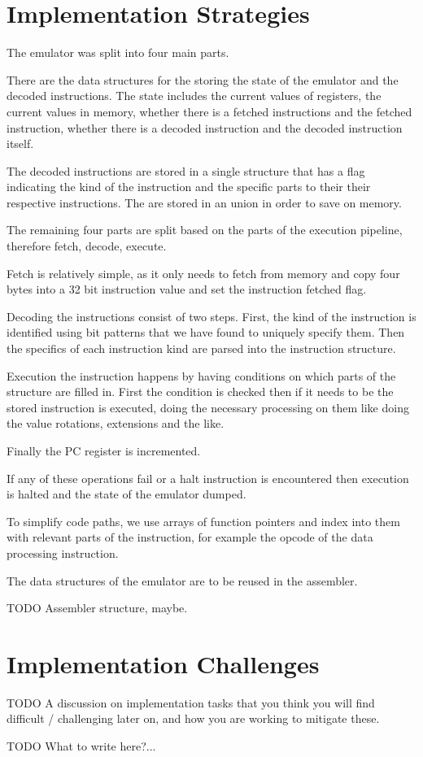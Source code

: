 \documentclass[11pt]{article}
\begin{document}
\section{Implementation Strategies}

The emulator was split into four main parts.

There are the data structures for the storing the state of the emulator and the
decoded instructions. The state includes the current values of registers, the
current values in memory, whether there is a fetched instructions and the
fetched instruction, whether there is a decoded instruction and the decoded
instruction itself.

The decoded instructions are stored in a single structure that has a flag
indicating the kind of the instruction and the specific parts to their their
respective instructions. The are stored in an union in order to save on memory.

The remaining four parts are split based on the parts of the execution pipeline,
therefore fetch, decode, execute.

Fetch is relatively simple, as it only needs to fetch from memory and copy four
bytes into a 32 bit instruction value and set the instruction fetched flag.

Decoding the instructions consist of two steps. First, the kind of the
instruction is identified using bit patterns that we have found to uniquely
specify them. Then the specifics of each instruction kind are parsed into the
instruction structure.

Execution the instruction happens by having conditions on which parts of the
structure are filled in. First the condition is checked then if it needs to be
the stored instruction is executed, doing the necessary processing on them like
doing the value rotations, extensions and the like.

Finally the PC register is incremented.

If any of these operations fail or a halt instruction is encountered then
execution is halted and the state of the emulator dumped.

To simplify code paths, we use arrays of function pointers and index into them
with relevant parts of the instruction, for example the opcode of the data
processing instruction.

The data structures of the emulator are to be reused in the assembler.

TODO Assembler structure, maybe.

\section{Implementation Challenges}

TODO A discussion on implementation tasks that you think you will find difficult
/ challenging later on, and how you are working to mitigate these.

TODO What to write here?...
\end{document}
